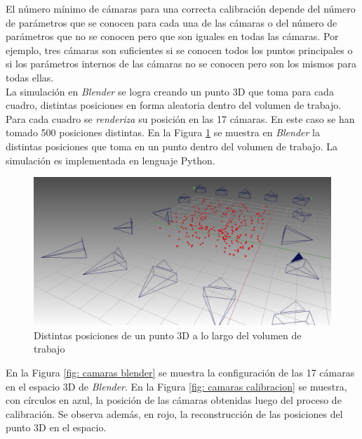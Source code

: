 El número mínimo de cámaras para una correcta calibración depende del número de parámetros que se conocen para cada una de las cámaras o del número de parámetros que no se conocen pero que son iguales en todas las cámaras. Por ejemplo, tres cámaras son suficientes si se conocen todos los puntos principales o si los parámetros internos de las cámaras no se conocen pero son los mismos para todas ellas.\\

La simulación en \emph{Blender} se logra creando un punto 3D que toma para cada cuadro, distintas posiciones en forma aleatoria dentro del volumen de trabajo. Para cada cuadro se \textit{renderiza} su posición en las 17 cámaras. En este caso se han tomado 500 posiciones distintas. En la Figura \ref{fig: blender toolbox laser} se muestra en \emph{Blender} la distintas posiciones que toma en un punto dentro del volumen de trabajo. La simulación es implementada en lenguaje Python.\\

\begin{figure}[ht!]
\begin{center}
\includegraphics[scale=0.32]{img/calibracion/blender_toolbox_laser.png}
\end{center}
\caption{Distintas posiciones de un punto 3D a lo largo del volumen de trabajo}
\label{fig: blender toolbox laser}
\end{figure}

En la Figura \ref{fig: camaras blender} se muestra la configuración de las 17 cámaras en el espacio 3D de \emph{Blender}. En la Figura \ref{fig: camaras calibracion} se muestra, con círculos en azul, la posición de las cámaras obtenidas luego del proceso de calibración. Se observa además, en rojo, la reconstrucción de las posiciones del punto 3D en el espacio. \\


